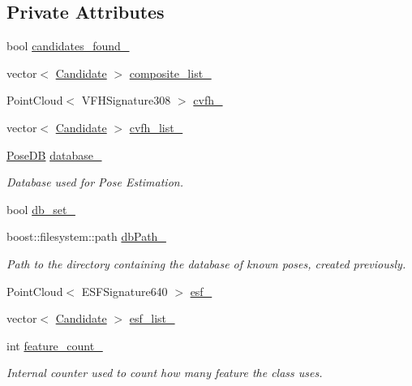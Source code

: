 \subsection*{Private Attributes}
\begin{DoxyCompactItemize}
\item 
bool \hyperlink{classPoseEstimation_aa9c90e1b5d640638bdb2f48bd9b9df11}{candidates\-\_\-found\-\_\-}
\item 
vector$<$ \hyperlink{classCandidate}{Candidate} $>$ \hyperlink{classPoseEstimation_a72f85d5bdac0049b35cf932715505f1d}{composite\-\_\-list\-\_\-}
\item 
Point\-Cloud$<$ V\-F\-H\-Signature308 $>$ \hyperlink{classPoseEstimation_a017646ee04a177539a060ab4bd2471f6}{cvfh\-\_\-}
\item 
vector$<$ \hyperlink{classCandidate}{Candidate} $>$ \hyperlink{classPoseEstimation_a173da6a606273315659157e43fe4c3ef}{cvfh\-\_\-list\-\_\-}
\item 
\hyperlink{classPoseDB}{Pose\-D\-B} \hyperlink{classPoseEstimation_a4c10437a72b2b8ac97cf92a55ee12236}{database\-\_\-}
\begin{DoxyCompactList}\small\item\em Database used for Pose Estimation. \end{DoxyCompactList}\item 
bool \hyperlink{classPoseEstimation_a86f675bcf1d652f32c3241f593a981ac}{db\-\_\-set\-\_\-}
\item 
boost\-::filesystem\-::path \hyperlink{classPoseEstimation_acac4c572e8500c78522eb1a741c908cb}{db\-Path\-\_\-}
\begin{DoxyCompactList}\small\item\em Path to the directory containing the database of known poses, created previously. \end{DoxyCompactList}\item 
Point\-Cloud$<$ E\-S\-F\-Signature640 $>$ \hyperlink{classPoseEstimation_ae5c93405275434048b7f81e64f1681d1}{esf\-\_\-}
\item 
vector$<$ \hyperlink{classCandidate}{Candidate} $>$ \hyperlink{classPoseEstimation_a9c3ae4cf6ca9e28a2f715c4cf2974610}{esf\-\_\-list\-\_\-}
\item 
int \hyperlink{classPoseEstimation_ade24adda1bd26f6bdf79b54088069d5d}{feature\-\_\-count\-\_\-}
\begin{DoxyCompactList}\small\item\em Internal counter used to count how many feature the class uses. \end{DoxyCompactList}\item 

\end{DoxyCompactItemize}
